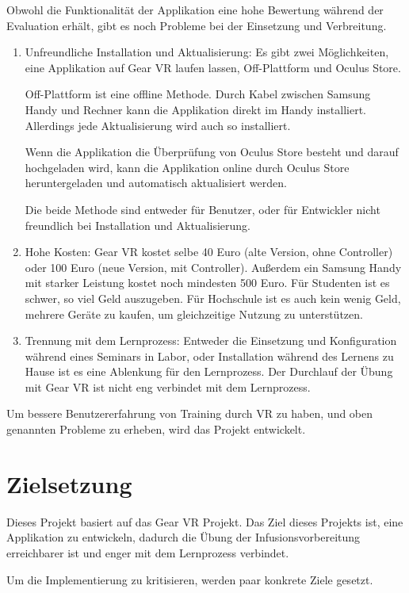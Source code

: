 Obwohl die Funktionalität der Applikation eine hohe Bewertung während der Evaluation erhält, gibt es noch Probleme bei der Einsetzung und Verbreitung.
\begin{enumerate}
\item Unfreundliche Installation und Aktualisierung: Es gibt zwei Möglichkeiten, eine Applikation auf Gear VR laufen lassen, Off-Plattform und Oculus Store.

Off-Plattform ist eine offline Methode. Durch Kabel zwischen Samsung Handy und Rechner kann die Applikation direkt im Handy installiert. Allerdings jede Aktualisierung wird auch so installiert.

Wenn die Applikation die Überprüfung von Oculus Store besteht und darauf hochgeladen wird, kann die Applikation online durch Oculus Store heruntergeladen und automatisch aktualisiert werden.

Die beide Methode sind entweder für Benutzer, oder für Entwickler nicht freundlich bei Installation und Aktualisierung.

\item Hohe Kosten: Gear VR kostet selbe 40 Euro (alte Version, ohne Controller) oder 100 Euro (neue Version, mit Controller). Außerdem ein Samsung Handy mit starker Leistung kostet noch mindesten 500 Euro. Für Studenten ist es schwer, so viel Geld auszugeben. Für Hochschule ist es auch kein wenig Geld, mehrere Geräte zu kaufen, um gleichzeitige Nutzung zu unterstützen.

\item Trennung mit dem Lernprozess: Entweder die Einsetzung und Konfiguration während eines Seminars in Labor, oder Installation während des Lernens zu Hause ist es eine Ablenkung für den Lernprozess. Der Durchlauf der Übung mit Gear VR ist nicht eng verbindet mit dem Lernprozess.
\end{enumerate}

Um bessere Benutzererfahrung von Training durch VR zu haben, und oben genannten Probleme zu erheben, wird das Projekt entwickelt.

\section{Zielsetzung}

Dieses Projekt basiert auf das Gear VR Projekt. Das Ziel dieses Projekts ist, eine Applikation zu entwickeln, dadurch die Übung der Infusionsvorbereitung erreichbarer ist und enger mit dem Lernprozess verbindet.

Um die Implementierung zu kritisieren, werden paar konkrete Ziele gesetzt.

